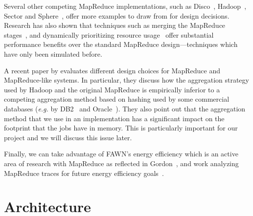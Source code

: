 \documentclass[10pt,letter,final,article,twocolumn]{article} %
\begin{document}
Several other competing MapReduce implementations, such as
Disco~\citep{disco10}, Hadoop~\citep{hadoop10}, Sector and
Sphere~\citep{sphere09}, offer more examples to draw from for design
decisions.  Research has also shown that techniques such as merging the
MapReduce stages~\citep{barrier10}, and dynamically prioritizing resource
usage~\citep{sandholm09} offer substantial performance benefits over the
standard MapReduce design---techniques which have only been simulated
before. 

A recent paper by \citet{yu2009distributed} evaluates different design choices for MapReduce and MapReduce-like systems. In particular, they discuss how the aggregation strategy used by Hadoop and the original MapReduce is empirically inferior to a competing aggregation method based on hashing used by some commercial databases (\emph{e.g.} by DB2~\citep{db210} and Oracle~\citep{oracle10}). They also point out that the aggregation method that we use in an implementation has a significant impact on the footprint that the jobs have in memory. This is particularly important for our project and we will discuss this issue later.

 Finally, we can take advantage of FAWN's energy efficiency which is
an active area of research with MapReduce as reflected in
Gordon~\citep{gordon09},  and work analyzing MapReduce traces for future
energy efficiency goals~\citep{chen10}.

\section{Architecture}
\end{document}
